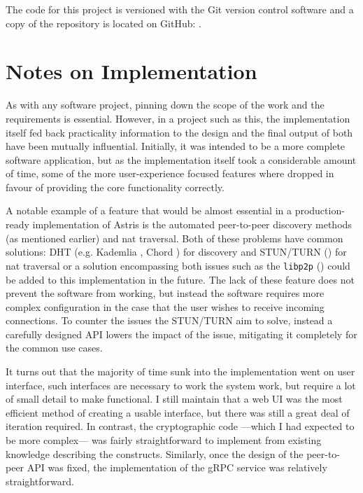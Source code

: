 The code for this project is versioned with the Git version control software and a copy of the repository is located on GitHub: \surl{\astrisrepo}.

\section{Notes on Implementation}
\label{ch:sw:notes}

As with any software project, pinning down the scope of the work and the requirements is essential. However, in a project such as this, the implementation itself fed back practicality information to the design and the final output of both have been mutually influential. Initially, it was intended to be a more complete software application, but as the implementation itself took a considerable amount of time, some of the more user-experience focused features where dropped in favour of providing the core functionality correctly.

A notable example of a feature that would be almost essential in a production-ready implementation of Astris is the automated peer-to-peer discovery methods (as mentioned earlier) and \gls{nat} traversal. Both of these problems have common solutions: DHT (e.g. Kademlia \cite{maymounkovKademliaPeertopeerInformation2002}, Chord \cite{ionstoicaChordScalablePeertopeer}) for discovery and STUN/TURN () for \gls{nat} traversal or a solution encompassing both issues such as the \texttt{libp2p} () could be added to this implementation in the future. The lack of these feature does not prevent the software from working, but instead the software requires more complex configuration in the case that the user wishes to receive incoming connections. To counter the issues the STUN/TURN aim to solve, instead a carefully designed API lowers the impact of the issue, mitigating it completely for the common use cases.

It turns out that the majority of time sunk into the implementation went on user interface, such interfaces are necessary to work the system work, but require a lot of small detail to make functional. I still maintain that a web UI was the most efficient method of creating a usable interface, but there was still a great deal of iteration required. In contrast, the cryptographic code ---which I had expected to be more complex--- was fairly straightforward to implement from existing knowledge describing the constructs. Similarly, once the design of the peer-to-peer API was fixed, the implementation of the gRPC service was relatively straightforward.



